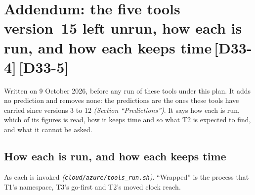 \documentclass[11pt]{article}
\newcommand{\gl}[1]{{\color{soft}\itshape\small (#1)}}
\newcommand{\chgold}[1]{\,{\color{oldcol}\bfseries\footnotesize[#1]}}
\begin{document}
\section[Addendum: the five tools version 15 left unrun]{Addendum: the five tools version~15 left unrun, how each is run, and how each keeps time\protect\chgold{D33-4}\protect\chgold{D33-5}}\label{sec:addendum-five}
Written on 9 October 2026, before any run of these tools under this plan. It adds no prediction and
removes none: the predictions are the ones these tools have carried since versions 3 to 12
\gl{Section ``Predictions''}. It says how each is run, which of its figures is read, how it keeps
time and so what T2 is expected to find, and what it cannot be asked.

\subsection*{How each is run, and how each keeps time}
As each is invoked \gl{\texttt{cloud/azure/tools\_run.sh}}. ``Wrapped'' is the process that T1's
namespace, T3's go-first and T2's moved clock reach.
\end{document}

